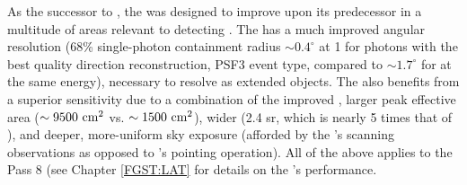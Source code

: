 As the successor to \egret{}, the \lat{} was designed to improve upon its predecessor in a multitude of areas relevant to detecting \snrs{} \citep{atwood09,lat_perf}. The \lat{} has a much improved angular resolution (68\% single-photon containment radius $\sim 0.4^{\circ}$ at 1\gev{} for photons with the best quality direction reconstruction, PSF3 event type, compared to $\sim 1.7^{\circ}$ for \egret{} at the same energy), necessary to resolve \snrs{} as extended objects. The \lat{} also benefits from a superior sensitivity due to a combination of the improved \psf, larger peak effective area ($ {\rm \sim 9500~cm^2}$ vs. ${\rm \sim 1500~cm^2}$), wider \fov{} (2.4 sr, which is nearly 5 times that of \egret{}), and deeper, more-uniform sky exposure (afforded by the \lat's scanning observations as opposed to \egret's pointing operation). All of the above applies to the Pass 8 \irf{} (see Chapter \ref{FGST:LAT} for details on the \lat{}'s performance.

